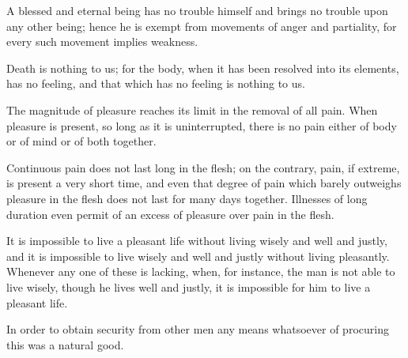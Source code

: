\documentclass{stex}
\begin{document}

\begin{sparagraph}[title=1]
  A blessed and eternal being has no trouble himself and brings no trouble upon any other being; hence he is exempt from movements of anger and partiality, for every such movement implies weakness.
\end{sparagraph}

\vspace{0.5em}
\begin{sparagraph}[title=2]
  Death is nothing to us; for the body, when it has been resolved into its elements, has no feeling, and that which has no feeling is nothing to us.
\end{sparagraph}

\vspace{0.5em}
\begin{sparagraph}[title=3]
  The magnitude of pleasure reaches its limit in the removal of all pain.
  When pleasure is present, so long as it is uninterrupted, there is no pain either of body or of mind or of both together.
\end{sparagraph}

\vspace{0.5em}
\begin{sparagraph}[title=4]
  Continuous pain does not last long in the flesh; on the contrary, pain, if extreme, is present a very short time, and even that degree of pain which barely outweighs pleasure in the flesh does not last for many days together.
  Illnesses of long duration even permit of an excess of pleasure over pain in the flesh.
\end{sparagraph}

\vspace{0.5em}
\begin{sparagraph}[title=5]
  It is impossible to live a pleasant life without living wisely and well and justly, and it is impossible to live wisely and well and justly without living pleasantly.
  Whenever any one of these is lacking, when, for instance, the man is not able to live wisely, though he lives well and justly, it is impossible for him to live a pleasant life.
\end{sparagraph}

\vspace{0.5em}
\begin{sparagraph}[title=6]
  In order to obtain security from other men any means whatsoever of procuring this was a natural good.
\end{sparagraph}
\end{document}
